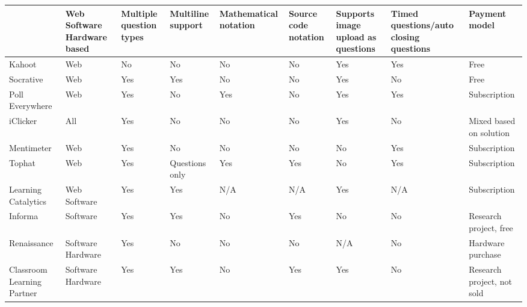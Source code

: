 \begin{landscape}
\thispagestyle{empty}
    \begin{center}
        \begin{table}[H]
            \begin{tabularx}{\paperwidth}{ |X|X|X|X|X|X|X|X|X| } 
             \hline
                 & Web \newline Software \newline Hardware based & Multiple question types & Multiline support & Mathematical notation & Source code notation & Supports image upload as questions & Timed questions/auto closing questions & Payment model \\ \hline
                 
              Kahoot                & Web   & No    & No    & \cellcolor{red!25}No    & \cellcolor{red!25}No    & Yes   & Yes   & Free \\ \hline
              Socrative             & Web   & Yes   & Yes   & \cellcolor{red!25}No    & \cellcolor{red!25}No    & Yes   & No    & Free \\ \hline
              Poll Everywhere       & Web   & Yes   & No    & \cellcolor{green!25}Yes   & \cellcolor{red!25}No    & Yes   & Yes   & Subscription \\ \hline
              iClicker              & All   & Yes   & No    & \cellcolor{red!25}No    & \cellcolor{red!25}No    & Yes   & No    & Mixed based on solution \\ \hline
              Mentimeter            & Web   & Yes & No   & \cellcolor{red!25}No    & \cellcolor{red!25}No    & No    & Yes   & Subscription \\ \hline
              Tophat                & Web   & Yes & Questions only & \cellcolor{green!25}Yes & \cellcolor{green!25}Yes   & No    & Yes & Subscription \\ \hline
              Learning Catalytics   & Web \newline Software   & Yes    & Yes  & N/A   & N/A   & Yes   & N/A   & Subscription \\ \hline
              Informa        & Software & Yes & Yes  & \cellcolor{red!25}No & \cellcolor{green!25}Yes   & No    & No    & Research project, free \\ \hline
              Renaissance           & Software \newline Hardware & Yes & No & \cellcolor{red!25} No & \cellcolor{red!25}No & N/A & No & Hardware purchase \\ \hline
              Classroom Learning Partner & Software \newline Hardware & Yes & Yes & \cellcolor{red!25}No & \cellcolor{green!25}Yes & Yes & No & Research project, not sold \\ \hline

\end{tabularx}
\end{table}
\end{center}
\end{landscape}
